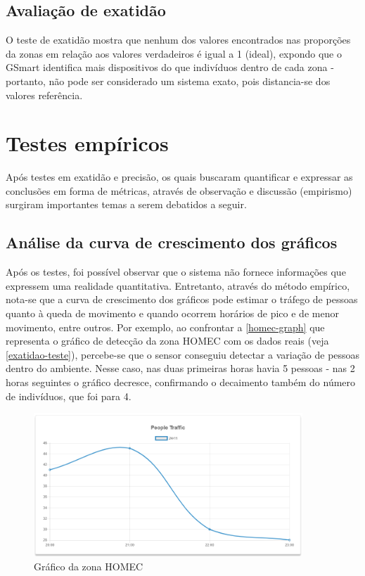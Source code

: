\subsection{Avaliação de exatidão}
O teste de exatidão mostra que nenhum dos valores encontrados nas proporções da zonas em relação aos valores verdadeiros é igual a 1 (ideal), expondo que o GSmart identifica mais dispositivos do que indivíduos dentro de cada zona - portanto, não pode ser considerado um sistema exato, pois distancia-se dos valores referência.


\section{Testes empíricos}
Após testes em exatidão e precisão, os quais buscaram quantificar e expressar as conclusões em forma de métricas, através de observação e discussão (empirismo) surgiram importantes temas a serem debatidos
a seguir.

\subsection{Análise da curva de crescimento dos gráficos}
Após os testes, foi possível observar que o sistema não fornece informações
que expressem uma realidade quantitativa. Entretanto, através do método
empírico, nota-se que a curva de crescimento dos gráficos pode estimar o tráfego
de pessoas quanto à queda de movimento e quando ocorrem horários de pico e de menor movimento, entre outros. Por exemplo, ao confrontar a \autoref{homec-graph} que representa
o gráfico de detecção da zona HOMEC com os dados reais (veja \autoref{exatidao-teste}), percebe-se que
o sensor conseguiu detectar a variação de pessoas dentro do ambiente. Nesse caso, nas duas primeiras horas havia 5 pessoas - nas 2 horas seguintes o gráfico decresce, confirmando o decaimento também do número de indivíduos, que foi para 4.

\begin{figure}[!h]
  \caption{\label{homec-graph}Gráfico da zona HOMEC}
  \begin{center}
    \includegraphics[width=0.90\textwidth]{img/graph-homec.png}
  \end{center}
\end{figure}

